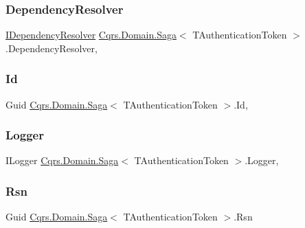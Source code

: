 \subsubsection{\texorpdfstring{Dependency\+Resolver}{DependencyResolver}}
{\footnotesize\ttfamily \hyperlink{interfaceCqrs_1_1Configuration_1_1IDependencyResolver}{I\+Dependency\+Resolver} \hyperlink{classCqrs_1_1Domain_1_1Saga}{Cqrs.\+Domain.\+Saga}$<$ T\+Authentication\+Token $>$.Dependency\+Resolver\hspace{0.3cm}{\ttfamily [get]}, {\ttfamily [protected]}}

\mbox{\label{classCqrs_1_1Domain_1_1Saga_af6b9552a90fcbe5c101c413126256565}} 
\subsubsection{\texorpdfstring{Id}{Id}}
{\footnotesize\ttfamily Guid \hyperlink{classCqrs_1_1Domain_1_1Saga}{Cqrs.\+Domain.\+Saga}$<$ T\+Authentication\+Token $>$.Id\hspace{0.3cm}{\ttfamily [get]}, {}}

\mbox{\label{classCqrs_1_1Domain_1_1Saga_aafb1c7c3c83211709322470a8fd150b5}} 
\subsubsection{\texorpdfstring{Logger}{Logger}}
{\footnotesize\ttfamily I\+Logger \hyperlink{classCqrs_1_1Domain_1_1Saga}{Cqrs.\+Domain.\+Saga}$<$ T\+Authentication\+Token $>$.Logger\hspace{0.3cm}{\ttfamily [get]}, {\ttfamily [protected]}}

\mbox{\label{classCqrs_1_1Domain_1_1Saga_a2a7053e3d31629aa8a25cb38a238aca5}} 
\subsubsection{\texorpdfstring{Rsn}{Rsn}}
{\footnotesize\ttfamily Guid \hyperlink{classCqrs_1_1Domain_1_1Saga}{Cqrs.\+Domain.\+Saga}$<$ T\+Authentication\+Token $>$.Rsn\hspace{0.3cm}{\ttfamily [get]}}

